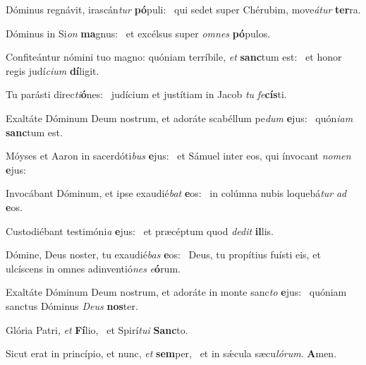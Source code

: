 \item Dóminus regnávit, irascán\textit{tur} \textbf{pó}puli:~\psstar{} qui sedet super Chérubim, move\textit{átur} \textbf{ter}ra.
\item Dóminus in Si\textit{on} \textbf{ma}gnus:~\psstar{} et excélsus super \textit{omnes} \textbf{pó}pulos.
\item Confiteántur nómini tuo magno: quóniam terríbile, \textit{et} \textbf{sanc}tum est:~\psstar{} et honor regis judí\textit{cium} \textbf{dí}ligit.
\item Tu parásti direc\textit{ti}\textbf{ó}nes:~\psstar{} judícium et justítiam in Jacob \textit{tu} \textit{fe}\textbf{cís}ti.
\item Exaltáte Dóminum Deum nostrum, et adoráte scabéllum pe\textit{dum} \textbf{e}jus:~\psstar{} quón\textit{iam} \textbf{sanc}tum est.
\item Móyses et Aaron in sacerdóti\textit{bus} \textbf{e}jus:~\psstar{} et Sámuel inter eos, qui ínvocant \textit{nomen} \textbf{e}jus:
\item Invocábant Dóminum, et ipse exaudié\textit{bat} \textbf{e}os:~\psstar{} in colúmna nubis loquebá\textit{tur} \textit{ad} \textbf{e}os.
\item Custodiébant testimóni\textit{a} \textbf{e}jus:~\psstar{} et præcéptum quod \textit{dedit} \textbf{il}lis.
\item Dómine, Deus noster, tu exaudié\textit{bas} \textbf{e}os:~\psstar{} Deus, tu propítius fuísti eis, et ulcíscens in omnes adinventió\textit{nes} \textit{e}\textbf{ó}rum.
\item Exaltáte Dóminum Deum nostrum, et adoráte in monte sanc\textit{to} \textbf{e}jus:~\psstar{} quóniam sanctus Dóminus \textit{Deus} \textbf{nos}ter.
\item Glória Patri, \textit{et} \textbf{Fí}lio,~\psstar{} et Spirí\textit{tui} \textbf{Sanc}to.
\item Sicut erat in princípio, et nunc, \textit{et} \textbf{sem}per,~\psstar{} et in sǽcula sæcu\textit{lórum}. \textbf{A}men.